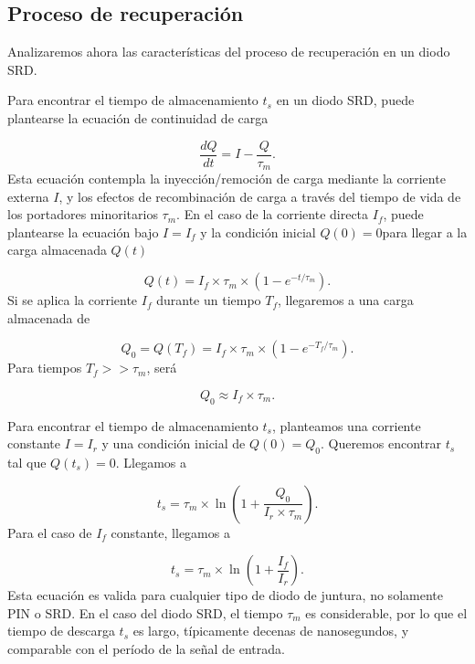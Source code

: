 \subsection{Proceso de recuperación}

Analizaremos ahora las características del proceso de recuperación en un diodo
SRD.

Para encontrar el tiempo de almacenamiento $t_s$ en un diodo SRD, puede
plantearse la ecuación de continuidad de carga \cite{moll1962} \cite{moll1969}

\begin{equation}
    \frac{dQ}{dt} = I-\frac{Q}{\tau_m}.
\end{equation}
Esta ecuación contempla la inyección/remoción de carga mediante la corriente
externa $I$, y los efectos de recombinación de carga a través del tiempo de vida
de los portadores minoritarios $\tau_m$. En el caso de la corriente directa
$I_f$, puede plantearse la ecuación bajo $I=I_f$ y la condición inicial $Q(0)=0$para llegar a la carga almacenada $Q(t)$

\begin{equation}
    Q(t) = I_f \times \tau_m \times \left( 1-e^{-t/\tau_m}\right).
\end{equation}
Si se aplica la corriente $I_f$ durante un tiempo $T_f$, llegaremos a una carga
almacenada de

\begin{equation}
    Q_0 = Q(T_f) = I_f \times \tau_m \times \left( 1-e^{-T_f/\tau_m}\right).
\end{equation}
Para tiempos $T_f >> \tau_m$, será

\begin{equation}
    Q_0 \approx I_f \times \tau_m.
\end{equation}

Para encontrar el tiempo de almacenamiento $t_s$, planteamos una corriente
constante $I=I_r$ y una condición inicial de $Q(0)=Q_0$. Queremos encontrar
$t_s$ tal que $Q(t_s) = 0$. Llegamos a

\begin{equation}
    t_s = \tau_m \times \ln \left( 1+\frac{Q_0}{I_r \times \tau_m}\right).
\end{equation}
Para el caso de $I_f$ constante, llegamos a

\begin{equation}
    t_s = \tau_m \times \ln \left( 1+\frac{I_f}{I_r}\right).
\end{equation}
Esta ecuación es valida para cualquier tipo de diodo de juntura, no solamente
PIN o SRD. En el caso del diodo SRD, el tiempo $\tau_m$ es considerable, por lo
que el tiempo de descarga $t_s$ es largo, típicamente decenas de nanosegundos, y comparable con el período de la señal de entrada.


